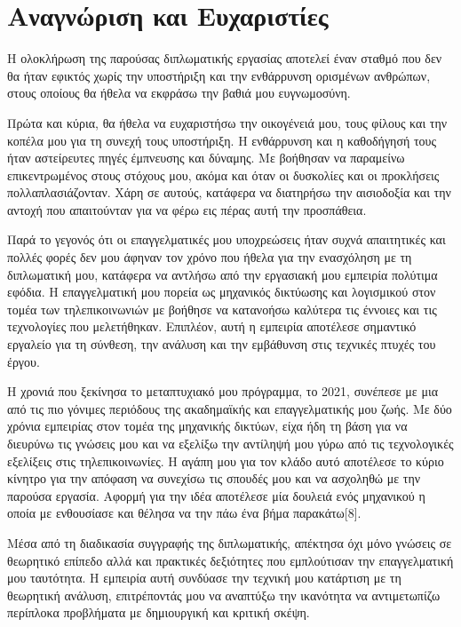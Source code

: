 
\chapter{Αναγνώριση και Ευχαριστίες}

Η ολοκλήρωση της παρούσας διπλωματικής εργασίας αποτελεί έναν σταθμό που δεν θα ήταν εφικτός χωρίς την υποστήριξη και την ενθάρρυνση ορισμένων ανθρώπων, στους οποίους θα ήθελα να εκφράσω την βαθιά μου ευγνωμοσύνη.

Πρώτα και κύρια, θα ήθελα να ευχαριστήσω την οικογένειά μου, τους φίλους και την  κοπέλα μου για τη συνεχή τους υποστήριξη. Η ενθάρρυνση και η καθοδήγησή τους ήταν αστείρευτες πηγές έμπνευσης και δύναμης. Με βοήθησαν να παραμείνω επικεντρωμένος στους στόχους μου, ακόμα και όταν οι δυσκολίες και οι προκλήσεις πολλαπλασιάζονταν. Χάρη σε αυτούς, κατάφερα να διατηρήσω την αισιοδοξία και την αντοχή που απαιτούνταν για να φέρω εις πέρας αυτή την προσπάθεια.

Παρά το γεγονός ότι οι επαγγελματικές μου υποχρεώσεις ήταν συχνά απαιτητικές και πολλές φορές δεν μου άφηναν τον χρόνο που ήθελα για την ενασχόληση με τη διπλωματική μου, κατάφερα να αντλήσω από την εργασιακή μου εμπειρία πολύτιμα εφόδια. Η επαγγελματική μου πορεία ως μηχανικός δικτύωσης και λογισμικού στον τομέα των τηλεπικοινωνιών με βοήθησε να κατανοήσω καλύτερα τις έννοιες και τις τεχνολογίες που μελετήθηκαν. Επιπλέον, αυτή η εμπειρία αποτέλεσε σημαντικό εργαλείο για τη σύνθεση, την ανάλυση και την εμβάθυνση στις τεχνικές πτυχές του έργου.

Η χρονιά που ξεκίνησα το μεταπτυχιακό μου πρόγραμμα, το 2021, συνέπεσε με μια από τις πιο γόνιμες περιόδους της ακαδημαϊκής και επαγγελματικής μου ζωής. Με δύο χρόνια εμπειρίας στον τομέα της μηχανικής δικτύων, είχα ήδη τη βάση για να διευρύνω τις γνώσεις μου και να εξελίξω την αντίληψή μου γύρω από τις τεχνολογικές εξελίξεις στις τηλεπικοινωνίες. Η αγάπη μου για τον κλάδο αυτό αποτέλεσε το κύριο κίνητρο για την απόφαση να συνεχίσω τις σπουδές μου και να ασχοληθώ με την παρούσα εργασία. Αφορμή για την ιδέα αποτέλεσε μία δουλειά ενός μηχανικού η οποία με ενθουσίασε και θέλησα να την πάω ένα βήμα παρακάτω[8].

Μέσα από τη διαδικασία συγγραφής της διπλωματικής, απέκτησα όχι μόνο γνώσεις σε θεωρητικό επίπεδο αλλά και πρακτικές δεξιότητες που εμπλούτισαν την επαγγελματική μου ταυτότητα. Η εμπειρία αυτή συνδύασε την τεχνική μου κατάρτιση με τη θεωρητική ανάλυση, επιτρέποντάς μου να αναπτύξω την ικανότητα να αντιμετωπίζω περίπλοκα προβλήματα με δημιουργική και κριτική σκέψη.

